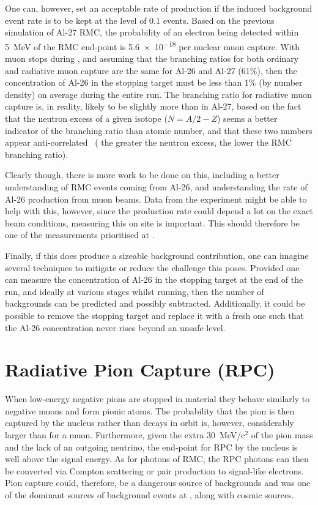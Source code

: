 One can, however, set an acceptable rate of production if the induced background event rate is to be kept at the level of 0.1 events.
Based on the previous simulation of Al-27 \ac{RMC}, the probability of an electron being detected within 5~MeV of the \ac{RMC} end-point is \num{5.6e-18} per nuclear muon capture.
With \VarTotalMuStops muon stops during \phaseII, and assuming that the branching ratios for both ordinary and radiative muon capture are the same for Al-26 and Al-27 (61\%), then the
concentration of Al-26 in the stopping target must be less than 1\% (by number density) on average during the entire \phaseII run.
The branching ratio for radiative muon capture is, in reality, likely to be slightly more than in Al-27, based on the fact that the neutron excess of a given isotope ($N=A/2-Z$) seems a better indicator of the branching ratio than atomic number, and that these two numbers appear anti-correlated~\cite{RevModPhys.76.31} ( the greater the neutron excess, the lower the RMC branching ratio).

Clearly though, there is more work to be done on this, including a better understanding of \ac{RMC} events coming from Al-26, and understanding the rate of Al-26 production from muon beams.
Data from the \alcap experiment might be able to help with this, however, since the production rate could depend a lot on the exact beam conditions, measuring this on site is important.
This should therefore be one of the measurements prioritised at \phaseI.

Finally, if this does produce a sizeable background contribution, one can imagine several techniques to mitigate or reduce the challenge this poses.
Provided one can measure the concentration of Al-26 in the stopping target at the end of the run, and ideally at various stages whilst running, then the number of backgrounds can be predicted and possibly subtracted.
Additionally, it could be possible to remove the stopping target and replace it with a fresh one such that the Al-26 concentration never rises beyond an unsafe level.

\section{Radiative Pion Capture (\acs{RPC})}
When low-energy negative pions are stopped in material they behave similarly to negative muons and form pionic atoms.
The probability that the pion is then captured by the nucleus rather than decays in orbit is, however, considerably larger than for a muon.
Furthermore, given the extra 30~MeV/c$^2$ of the pion mass and the lack of an outgoing neutrino, the end-point for \acf{RPC} by the nucleus is well above the \mueconv signal energy.
As for photons of \ac{RMC}, the \ac{RPC} photons can then be converted via Compton scattering or pair production to signal-like electrons.
Pion capture could, therefore, be a dangerous source of backgrounds and was one of the dominant sources of background events at \sindrumII, along with cosmic sources.

